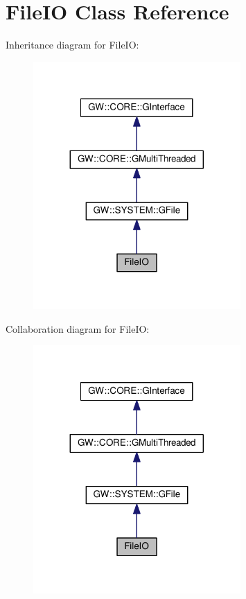 \hypertarget{classFileIO}{}\section{File\+IO Class Reference}
\label{classFileIO}


Inheritance diagram for File\+IO\+:
\nopagebreak
\begin{figure}[H]
\begin{center}
\leavevmode
\includegraphics[width=224pt]{classFileIO__inherit__graph}
\end{center}
\end{figure}


Collaboration diagram for File\+IO\+:
\nopagebreak
\begin{figure}[H]
\begin{center}
\leavevmode
\includegraphics[width=224pt]{classFileIO__coll__graph}
\end{center}
\end{figure}
